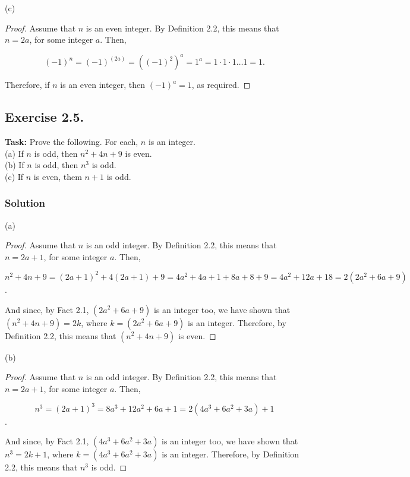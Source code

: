 \documentclass{article}
\begin{document}
\noindent (c) 

\begin{proof}
    Assume that $n$ is an even integer. By Definition 2.2, this means that $n=2a$, for some integer $a$. Then,

   \[(-1)^n = (-1)^{(2a)} = ((-1)^{2})^{a} = 1^{a} = 1 \cdot 1 \cdot 1 \dots 1 = 1.\]

     Therefore, if $n$ is an even integer, then $(-1)^a = 1$, as required.
\end{proof}

\subsection{Exercise 2.5.} 
\textbf{Task:} Prove the following. For each, $n$ is an integer.\\
(a) If $n$ is odd, then $n^2+4n+9$ is even.\\
(b) If $n$ is odd, then $n^3$ is odd.\\
(c) If $n$ is even, them $n+1$ is odd.\\

\subsubsection*{Solution}

(a)

\begin{proof}
    Assume that $n$ is an odd integer. By Definition 2.2, this means that $n=2a+1$, for some integer $a$. Then,

    \[n^2+4n+9=(2a+1)^2+4(2a+1)+9=4a^2+4a+1+8a+8+9=4a^2+12a+18=2(2a^2+6a+9)\].

    And since, by Fact 2.1, $(2a^2+6a+9)$ is an integer too, we have shown that $(n^2+4n+9)=2k$, where $k=(2a^2+6a+9)$ is an integer. Therefore, by Definition 2.2, this means that $(n^2+4n+9)$ is even.
\end{proof}

\newpage

\noindent (b)

\begin{proof}
    Assume that $n$ is an odd integer. By Definition 2.2, this means that $n=2a+1$, for some integer $a$. Then,

    \[n^3=(2a+1)^3=8a^3+12a^2+6a+1=2(4a^3+6a^2+3a)+1\].

    And since, by Fact 2.1, $(4a^3+6a^2+3a)$ is an integer too, we have shown that $n^3=2k+1$, where $k=(4a^3+6a^2+3a)$ is an integer. Therefore, by Definition 2.2, this means that $n^3$ is odd.
\end{proof}
\end{document}
